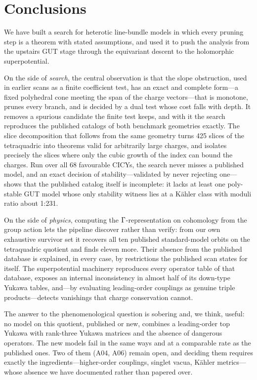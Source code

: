 \section{Conclusions}
\label{sec:conclusions}

We have built a search for heterotic line-bundle models in which every pruning
step is a theorem with stated assumptions, and used it to push the analysis from
the upstairs GUT stage through the equivariant descent to the holomorphic
superpotential.

On the side of \emph{search}, the central observation is that the slope
obstruction, used in earlier scans as a finite coefficient test, has an exact
and complete form---a fixed polyhedral cone meeting the span of the charge
vectors---that is monotone, prunes every branch, and is decided by a dual test
whose cost falls with depth. It removes a spurious candidate the finite test
keeps, and with it the search reproduces the published catalogs of both
benchmark geometries exactly. The slice decomposition that follows from the same
geometry turns 425 slices of the tetraquadric into theorems valid for
arbitrarily large charges, and isolates precisely the slices where only the
cubic growth of the index can bound the charges. Run over all 68 favourable
CICYs, the search never misses a published model, and an exact decision of
stability---validated by never rejecting one---shows that the published catalog
itself is incomplete: it lacks at least one poly-stable GUT model whose only
stability witness lies at a Kähler class with moduli ratio about 1:231.

On the side of \emph{physics}, computing the $\Gamma$-representation on cohomology
from the group action lets the pipeline discover rather than verify: from our
own exhaustive survivor set it recovers all ten published standard-model orbits
on the tetraquadric quotient and finds eleven more. Their absence from the
published database is explained, in every case, by restrictions the published
scan states for itself. The superpotential machinery reproduces every operator
table of that database, exposes an internal inconsistency in almost half of its
down-type Yukawa tables, and---by evaluating leading-order couplings as genuine
triple products---detects vanishings that charge conservation cannot.

The answer to the phenomenological question is sobering and, we think, useful:
no model on this quotient, published or new, combines a leading-order top Yukawa
with rank-three Yukawa matrices and the absence of dangerous operators. The new
models fail in the same ways and at a comparable rate as the published ones. Two
of them (A04, A06) remain open, and deciding them requires exactly the
ingredients---higher-order couplings, singlet vacua, Kähler metrics---whose
absence we have documented rather than papered over.

